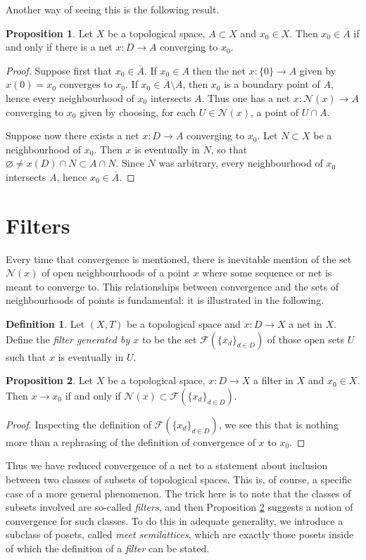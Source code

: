 \documentclass{book}
\theoremstyle{definition}
\newtheorem{proposition}{Proposition}[section]
\newtheorem{definition}{Definition}[section]
\theoremstyle{remark}
\newcommand{\neigh}[1]{\mathcal N(#1)}
\newcommand{\filt}[1]{\mathcal F(#1)}
\begin{document}
Another way of seeing this is the following result.
\begin{proposition}
Let $X$ be a topological space, $A\subset X$ and $x_0\in X$. Then $x_0\in \overline A$ if and only if there is a net $x:D\to A$ converging to $x_0$.
\end{proposition}
\begin{proof}
Suppose first that $x_0\in\overline A$. If $x_0\in A$ then the net $x:\{0\}\to A$ given by $x(0)=x_0$ converges to $x_0$. If $x_0\in\overline A\setminus A$, then $x_0$ is a boundary point of $A$, hence every neighbourhood of $x_0$ intersects $A$. Thus one has a net $x:\neigh{x}\to A$ converging to $x_0$ given by choosing, for each $U\in \neigh{x}$, a point of $U\cap A$.

Suppose now there exists a net $x:D\to A$ converging to $x_0$. Let $N\subset X$ be a neighbourhood of $x_0$. Then $x$ is eventually in $N$, so that $\varnothing\neq x(D)\cap N\subset A\cap N$. Since $N$ was arbitrary, every neighbourhood of $x_0$ intersects $A$, hence $x_0\in\overline A$.
\end{proof}



\section{Filters}
Every time that convergence is mentioned, there is inevitable mention of the set $\neigh{x}$ of open neighbourhoods of a point $x$ where some sequence or net is meant to converge to. This relationships between convergence and the sets of neighbourhoods of points is fundamental: it is illustrated in the following.

\begin{definition}
Let $(X,T)$ be a topological space and $x:D\to X$ a net in $X$. Define the \textit{filter generated by $x$} to be the set $\filt{\{x_d\}_{d\in D}}$ of those open sets $U$ such that $x$ is eventually in $U$.
\end{definition}
\begin{proposition}
\label{netfilterconvergence}
Let $X$ be a topological space, $x:D\to X$ a filter in $X$ and $x_0\in X$. Then $x\to x_0$ if and only if $\neigh{x}\subset \filt{\{x_d\}_{d\in D}}$.
\end{proposition}
\begin{proof}
Inspecting the definition of $\filt{\{x_d\}_{d\in D}}$, we see this that is nothing more than a rephrasing of the definition of convergence of $x$ to $x_0$.
\end{proof}
Thus we have reduced convergence of a net to a statement about inclusion between two classes of subsets of topological spaces. This is, of course, a specific case of a more general phenomenon. The trick here is to note that the classes of subsets involved are so-called \textit{filters}, and then Proposition \ref{netfilterconvergence} suggests a notion of convergence for such classes. To do this in adequate generality, we introduce a subclass of posets, called \textit{meet semilattices}, which are exactly those posets inside of which the definition of a \textit{filter} can be stated.
\end{document}
